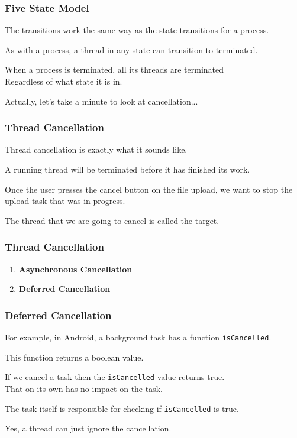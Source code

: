 \begin{frame}
\frametitle{Five State Model}

The transitions work the same way as the state transitions for a process. 

As with a process, a thread in any state can transition to terminated.

When a process is terminated, all its threads are terminated\\
\quad Regardless of what state it is in.

Actually, let's take a minute to look at cancellation...

\end{frame}

\begin{frame}
\frametitle{Thread Cancellation}

Thread cancellation is exactly what it sounds like. 

A running thread will be terminated before it has finished its work. 

Once the user presses the cancel button on the file upload, we want to stop the upload task that was in progress. 

The thread that we are going to cancel is called the \alert{target}.

\end{frame}

\begin{frame}
\frametitle{Thread Cancellation}

\begin{enumerate}
	\item \textbf{Asynchronous Cancellation}
	\item \textbf{Deferred Cancellation} 
\end{enumerate}

\end{frame}

\begin{frame}
\frametitle{Deferred Cancellation}

For example, in Android, a background task has a function \texttt{isCancelled}.

This function returns a boolean value. 

If we cancel a task then the \texttt{isCancelled} value returns true.\\
\quad That  on its own has no impact on the task. 

The task itself is responsible for checking if \texttt{isCancelled} is true.

Yes, a thread can just ignore the cancellation.

\end{frame}

